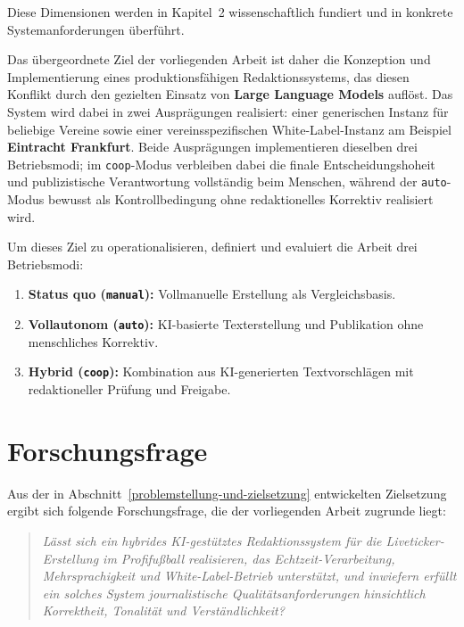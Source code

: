 Diese Dimensionen werden in Kapitel~2 wissenschaftlich fundiert und in
konkrete Systemanforderungen überführt.

Das übergeordnete Ziel der vorliegenden Arbeit ist daher die Konzeption
und Implementierung eines produktionsfähigen Redaktionssystems, das
diesen Konflikt durch den gezielten Einsatz von \textbf{Large Language
Models} auflöst. Das System wird dabei in zwei Ausprägungen realisiert:
einer generischen Instanz für beliebige Vereine sowie einer
vereinsspezifischen White-Label-Instanz am Beispiel \textbf{Eintracht
Frankfurt}. Beide Ausprägungen implementieren dieselben drei
Betriebsmodi; im \texttt{coop}-Modus verbleiben dabei die finale
Entscheidungshoheit und publizistische Verantwortung vollständig beim
Menschen, während der \texttt{auto}-Modus bewusst als Kontrollbedingung
ohne redaktionelles Korrektiv realisiert wird.

Um dieses Ziel zu operationalisieren, definiert und evaluiert die Arbeit
drei Betriebsmodi:

\begin{enumerate}
\def\labelenumi{\arabic{enumi}.}
\tightlist
\item
  \textbf{Status quo (\texttt{manual}):} Vollmanuelle Erstellung als
  Vergleichsbasis.
\item
  \textbf{Vollautonom (\texttt{auto}):} KI-basierte Texterstellung und
  Publikation ohne menschliches Korrektiv.
\item
  \textbf{Hybrid (\texttt{coop}):} Kombination aus KI-generierten
  Textvorschlägen mit redaktioneller Prüfung und Freigabe.
\end{enumerate}



\section{Forschungsfrage}\label{forschungsfrage}

Aus der in Abschnitt~\ref{problemstellung-und-zielsetzung} entwickelten Zielsetzung ergibt sich folgende Forschungsfrage, die der vorliegenden Arbeit zugrunde liegt:

\begin{quote}
\emph{Lässt sich ein hybrides KI-gestütztes Redaktionssystem für die Liveticker-Erstellung im Profifußball realisieren, das Echtzeit-Verarbeitung, Mehrsprachigkeit und White-Label-Betrieb unterstützt, und inwiefern erfüllt ein solches System journalistische Qualitätsanforderungen hinsichtlich Korrektheit, Tonalität und Verständlichkeit?}
\end{quote}

